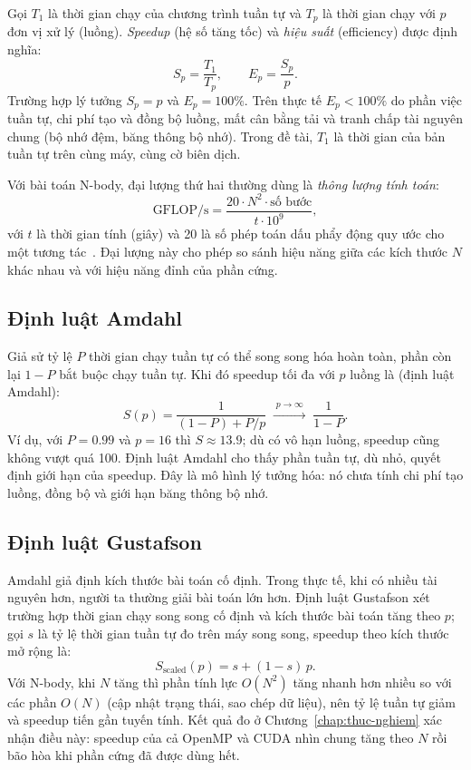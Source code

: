 Gọi $T_1$ là thời gian chạy của chương trình tuần tự và $T_p$ là thời gian chạy với $p$ đơn vị xử lý (luồng). \emph{Speedup} (hệ số tăng tốc) và \emph{hiệu suất} (efficiency) được định nghĩa:
\begin{equation}
S_p = \frac{T_1}{T_p}, \qquad E_p = \frac{S_p}{p}.
\label{eq:speedup}
\end{equation}
Trường hợp lý tưởng $S_p = p$ và $E_p = 100\%$. Trên thực tế $E_p < 100\%$ do phần việc tuần tự, chi phí tạo và đồng bộ luồng, mất cân bằng tải và tranh chấp tài nguyên chung (bộ nhớ đệm, băng thông bộ nhớ). Trong đề tài, $T_1$ là thời gian của bản tuần tự trên cùng máy, cùng cờ biên dịch.

Với bài toán N-body, đại lượng thứ hai thường dùng là \emph{thông lượng tính toán}:
\begin{equation}
\text{GFLOP/s} = \frac{20 \cdot N^2 \cdot \text{số bước}}{t \cdot 10^9},
\end{equation}
với $t$ là thời gian tính (giây) và 20 là số phép toán dấu phẩy động quy ước cho một tương tác~\cite{gpugems3}. Đại lượng này cho phép so sánh hiệu năng giữa các kích thước $N$ khác nhau và với hiệu năng đỉnh của phần cứng.

\subsection{Định luật Amdahl}

Giả sử tỷ lệ $P$ thời gian chạy tuần tự có thể song song hóa hoàn toàn, phần còn lại $1-P$ bắt buộc chạy tuần tự. Khi đó speedup tối đa với $p$ luồng là (định luật Amdahl):
\begin{equation}
S(p)=\frac{1}{(1-P)+P/p} \;\xrightarrow{\;p\to\infty\;}\; \frac{1}{1-P}.
\label{eq:amdahl}
\end{equation}
Ví dụ, với $P=0.99$ và $p=16$ thì $S \approx 13.9$; dù có vô hạn luồng, speedup cũng không vượt quá 100. Định luật Amdahl cho thấy phần tuần tự, dù nhỏ, quyết định giới hạn của speedup. Đây là mô hình lý tưởng hóa: nó chưa tính chi phí tạo luồng, đồng bộ và giới hạn băng thông bộ nhớ.

\subsection{Định luật Gustafson}

Amdahl giả định kích thước bài toán cố định. Trong thực tế, khi có nhiều tài nguyên hơn, người ta thường giải bài toán lớn hơn. Định luật Gustafson xét trường hợp thời gian chạy song song cố định và kích thước bài toán tăng theo $p$; gọi $s$ là tỷ lệ thời gian tuần tự đo trên máy song song, speedup theo kích thước mở rộng là:
\begin{equation}
S_{\text{scaled}}(p) = s + (1-s)\,p.
\end{equation}
Với N-body, khi $N$ tăng thì phần tính lực $O(N^2)$ tăng nhanh hơn nhiều so với các phần $O(N)$ (cập nhật trạng thái, sao chép dữ liệu), nên tỷ lệ tuần tự giảm và speedup tiến gần tuyến tính. Kết quả đo ở Chương~\ref{chap:thuc-nghiem} xác nhận điều này: speedup của cả OpenMP và CUDA nhìn chung tăng theo $N$ rồi bão hòa khi phần cứng đã được dùng hết.

